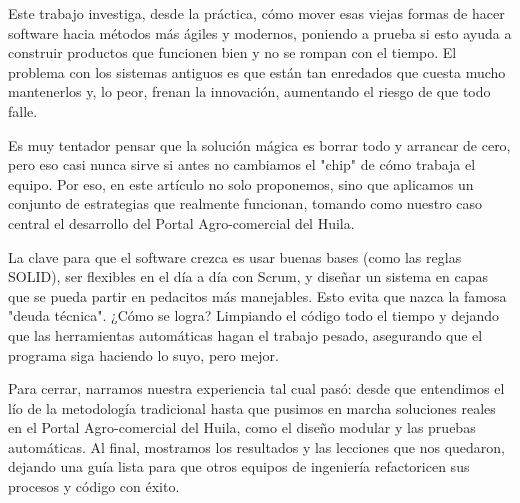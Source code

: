 Este trabajo investiga, desde la práctica, cómo mover esas viejas formas de hacer software hacia métodos más ágiles y modernos, poniendo a prueba si esto ayuda a construir productos que funcionen bien y no se rompan con el tiempo. El problema con los sistemas antiguos es que están tan enredados que cuesta mucho mantenerlos y, lo peor, frenan la innovación, aumentando el riesgo de que todo falle.

Es muy tentador pensar que la solución mágica es borrar todo y arrancar de cero, pero eso casi nunca sirve si antes no cambiamos el "chip" de cómo trabaja el equipo. Por eso, en este artículo no solo proponemos, sino que aplicamos un conjunto de estrategias que realmente funcionan, tomando como nuestro caso central el desarrollo del Portal Agro-comercial del Huila.

La clave para que el software crezca es usar buenas bases (como las reglas SOLID), ser flexibles en el día a día con Scrum, y diseñar un sistema en capas que se pueda partir en pedacitos más manejables. Esto evita que nazca la famosa "deuda técnica". ¿Cómo se logra? Limpiando el código todo el tiempo y dejando que las herramientas automáticas hagan el trabajo pesado, asegurando que el programa siga haciendo lo suyo, pero mejor.

Para cerrar, narramos nuestra experiencia tal cual pasó: desde que entendimos el lío de la metodología tradicional hasta que pusimos en marcha soluciones reales en el Portal Agro-comercial del Huila, como el diseño modular y las pruebas automáticas. Al final, mostramos los resultados y las lecciones que nos quedaron, dejando una guía lista para que otros equipos de ingeniería refactoricen sus procesos y código con éxito.